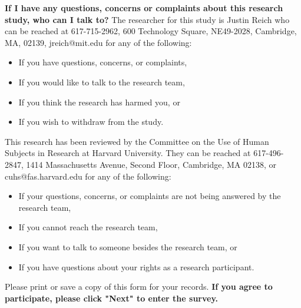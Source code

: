 \documentclass[pdftex, brazil, 12pt, twoside]{article}
\begin{document}
\textbf{If I have any questions, concerns or complaints about this research study, who can I talk to?}
The researcher for this study is Justin Reich who can be reached at 617-715-2962, 600 Technology Square, NE49-2028, Cambridge, MA, 02139, jreich@mit.edu for any of the following:
\begin{itemize}
\item If you have questions, concerns, or complaints,
\item If you would like to talk to the research team,
\item If you think the research has harmed you, or
\item If you wish to withdraw from the study.
\end{itemize}

This research has been reviewed by the Committee on the Use of Human Subjects in Research at Harvard University.  They can be reached at 617-496-2847, 1414 Massachusetts Avenue, Second Floor, Cambridge, MA 02138, or cuhs@fas.harvard.edu for any of the following:
\begin{itemize}
\item If your questions, concerns, or complaints are not being answered by the research team,
\item If you cannot reach the research team,
\item If you want to talk to someone besides the research team, or
\item If you have questions about your rights as a research participant.
\end{itemize}

Please print or save a copy of this form for your records.
\textbf{If you agree to participate, please click "Next" to enter the survey.}

\begin{figure}[H]
  \begin{center}
    \label{fig:survey01}
  \end{center}
\end{figure}
\end{document}
